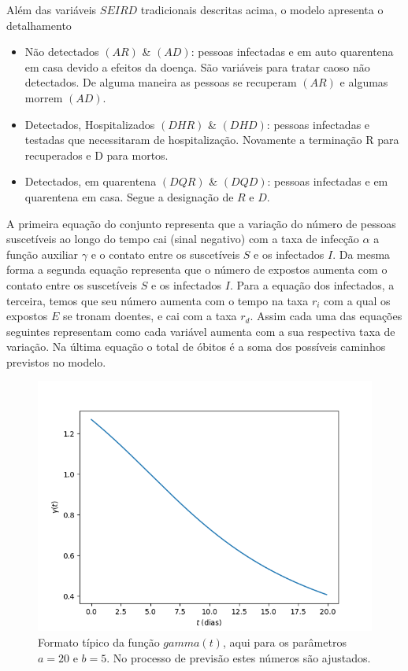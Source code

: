 \documentclass[12pt]{article}
\begin{document}
   Além das variáveis $SEIRD$ tradicionais descritas acima, o modelo apresenta o detalhamento 
   \begin{itemize}
   \item Não detectados $(AR)$ \& $(AD)$: pessoas infectadas e em auto quarentena em casa devido a efeitos da doença. São variáveis para tratar caoso não detectados. De alguma maneira as pessoas se recuperam $(AR)$ e algumas morrem  $(AD)$.
   
   \item Detectados, Hospitalizados $(DHR)$ \& $(DHD)$: pessoas infectadas e testadas que necessitaram de hospitalização. Novamente a terminação R para recuperados e D para mortos.
   
   \item Detectados, em quarentena $(DQR)$ \& $(DQD)$: pessoas infectadas e em quarentena em casa. Segue a designação de $R$ e $D$.
   
   \end{itemize}
   
   A primeira equação do conjunto representa que a variação do número de pessoas suscetíveis ao longo do tempo cai (sinal negativo) com a taxa de infecção $\alpha$ a função auxiliar $\gamma$ e o contato entre os suscetíveis $S$ e os infectados $I$. Da mesma forma a segunda equação representa que o número de expostos aumenta com o contato entre os suscetíveis $S$ e os infectados $I$. Para a equação dos infectados, a terceira, temos que seu número aumenta com o tempo na taxa $r_i$ com a qual os expostos $E$ se tronam doentes, e cai com a taxa $r_d$. Assim cada uma das equações seguintes representam como cada variável aumenta com a sua respectiva taxa de variação.  Na última equação o total de óbitos é a soma dos possíveis caminhos previstos no modelo.

   \begin{figure}[!htb]
    \centering
    \includegraphics[width=.6\textwidth]{figs/gamma_1.png}
     \caption{Formato típico da função \(gamma (t)\), aqui para os parâmetros \(a = 20\) e \(b = 5\). No processo de previsão estes números são ajustados.}
     \label{gamma}
    \end{figure}
\end{document}
